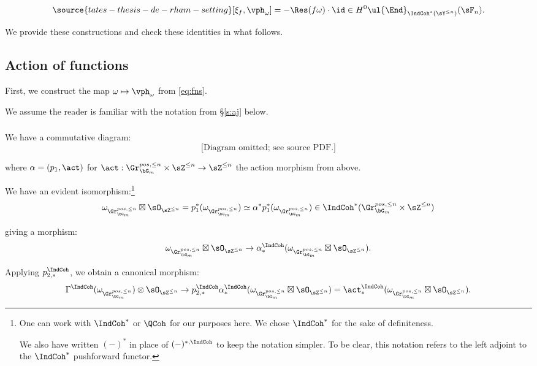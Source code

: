 \begin{equation}\label{eq:uncertainty}
\source{tates-thesis-de-rham-setting}
[\xi_f,\vph_{\omega}] = -\Res(f\omega) \cdot \id \in
H^0\ul{\End}_{\IndCoh^*(\sY^{\leq n})}(\sF_n).
\end{equation}

We provide these constructions and check these identities in what follows.

\subsection{Action of functions}\label{ss:fn-intro}

First, we construct the map $\omega \mapsto \vph_{\omega}$
from \eqref{eq:fns}.

We assume the reader is familiar with the notation
from \S \ref{s:aj} below.

\subsubsection{}\label{ss:fn-concl}

We have a commutative diagram:
%
\[
\text{[Diagram omitted; see source PDF.]}
\]

 where $\alpha = (p_1,\act)$ for
$\act:\Gr_{\bG_m}^{pos,\leq n} \times \sZ^{\leq n} \to \sZ^{\leq n}$
the action morphism from above.

We have an evident isomorphism:\footnote{One can work with
$\IndCoh^*$ or $\QCoh$ for our purposes here.
We chose
$\IndCoh^*$ for the sake of definiteness.

We also have
written $(-)^*$ in place of $(-)^{*,\IndCoh}$ to keep
the notation simpler. To be clear, this notation refers to
the left adjoint to the $\IndCoh^*$ pushforward functor.}
%
\[
\omega_{\Gr_{\bG_m}^{pos,\leq n}} \boxtimes
\sO_{\sZ^{\leq n}} =
p_1^*(\omega_{\Gr_{\bG_m}^{pos,\leq n}}) \simeq
\alpha^*p_1^*(\omega_{\Gr_{\bG_m}^{pos,\leq n}}) \in
\IndCoh^*(\Gr_{\bG_m}^{pos,\leq n} \times \sZ^{\leq n})
\]

 giving a morphism:
%
\[
\omega_{\Gr_{\bG_m}^{pos,\leq n}} \boxtimes
\sO_{\sZ^{\leq n}} \to
\alpha_*^{\IndCoh}(\omega_{\Gr_{\bG_m}^{pos,\leq n}} \boxtimes
\sO_{\sZ^{\leq n}}).
\]

 Applying $p_{2,*}^{\IndCoh}$, we obtain a canonical
morphism:
%
\[
\Gamma^{\IndCoh}(\omega_{\Gr_{\bG_m}^{pos,\leq n}}) \otimes
\sO_{\sZ^{\leq n}} \to
p_{2,*}^{\IndCoh}
\alpha_*^{\IndCoh}(\omega_{\Gr_{\bG_m}^{pos,\leq n}} \boxtimes
\sO_{\sZ^{\leq n}}) =
\act_*^{\IndCoh}(\omega_{\Gr_{\bG_m}^{pos,\leq n}} \boxtimes
\sO_{\sZ^{\leq n}}).
\]

